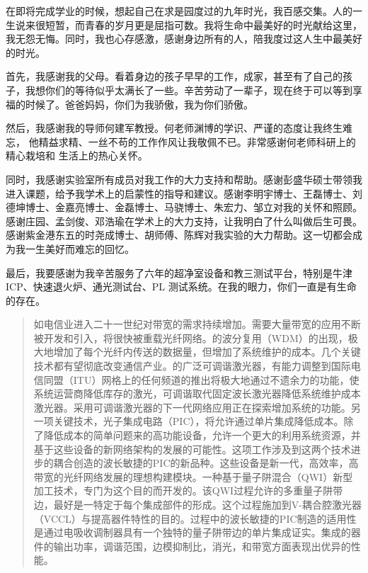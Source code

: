 \documentclass{ZJUthesis}
\begin{document}
\begin{thanks}
在即将完成学业的时候，想起自己在求是园度过的九年时光，我百感交集。人的一生说来很短暂，而青春的岁月更是屈指可数。我将生命中最美好的时光献给这里，我无怨无悔。同时，我也心存感激，感谢身边所有的人，陪我度过这人生中最美好的时光。

首先，我感谢我的父母。看着身边的孩子早早的工作，成家，甚至有了自己的孩子，我想你们的等待似乎太满长了一些。辛苦劳动了一辈子，现在终于可以等到享福的时候了。爸爸妈妈，你们为我骄傲，我为你们骄傲。

然后，我感谢我的导师何建军教授。何老师渊博的学识、严谨的态度让我终生难忘，
他精益求精、一丝不苟的工作作风让我敬佩不已。非常感谢何老师科研上的精心栽培和
生活上的热心关怀。

同时，我感谢实验室所有成员对我工作的大力支持和帮助。感谢彭盛华硕士带领我进入课题，给予我学术上的启蒙性的指导和建议。感谢李明宇博士、王磊博士、刘德坤博士、金嘉亮博士、金磊博士、马骁博士、朱宏力、邹立对我的关怀和照顾。感谢庄园、孟剑俊、邓浩瑜在学术上的大力支持，让我明白了什么叫做后生可畏。感谢紫金港东五的时尧成博士、胡师傅、陈辉对我实验的大力帮助。这一切都会成为我一生美好而难忘的回忆。

最后，我要感谢为我辛苦服务了六年的超净室设备和教三测试平台，特别是牛津ICP、快速退火炉、通光测试台、PL 测试系统。在我的眼力，你们一直是有生命的存在。
\end{thanks}

\begin{abstract}
如电信业进入二十一世纪对带宽的需求持续增加。需要大量带宽的应用不断被开发和引入，将很快被重载光纤网络。的波分复用（WDM）的出现，极大地增加了每个光纤内传送的数据量，但增加了系统维护的成本。几个关键技术都有望彻底改变通信产业。的广泛可调谐激光器，有能力调整到国际电信同盟（ITU）网格上的任何频道的推出将极大地通过不遗余力的功能，使系统运营商降低库存的激光，可调谐取代固定波长激光器降低系统维护成本激光器。采用可调谐激光器的下一代网络应用正在探索增加系统的功能。另一项关键技术，光子集成电路（PIC），将允许通过单片集成降低成本。除了降低成本的简单问题来的高功能设备，允许一个更大的利用系统资源，并基于这些设备的新网络架构的发展的可能性。这项工作涉及到这两个技术进步的耦合创造的波长敏捷的PIC的新品种。这些设备是新一代，高效率，高带宽的光纤网络发展的理想构建模块。一种基于量子阱混合（QWI）新型加工技术，专门为这个目的而开发的。该QWI过程允许的多重量子阱带边，最好是一特定于每个集成部件的形成。这个过程施加到V-耦合腔激光器（VCCL）与提高器件特性的目的。过程中的波长敏捷的PIC制造的适用性是通过电吸收调制器具有一个独特的量子阱带边的单片集成证实。集成的器件的输出功率，调谐范围，边模抑制比，消光，和带宽方面表现出优异的性能。

\end{abstract}
\end{document}
